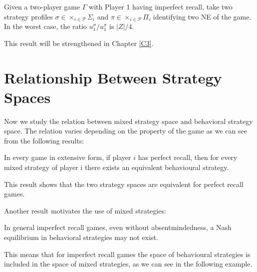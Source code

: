 \begin{prop}\label{prop:Z}
	Given a two-player game $\Gamma$ with Player 1 having imperfect recall, take two strategy profiles $\sigma\in \times_{i\in\mathcal{P}}\Sigma_i $ and $\pi\in \times_{i\in\mathcal{P}}\Pi_i$ identifying two NE of the game. In the worst case, the ratio $u_1^\sigma/u_1^\pi$ is $|Z|/4$.
\end{prop}

This result will be strengthened in Chapter \ref{C3}.




\section{Relationship Between Strategy Spaces}

Now we study the relation between mixed strategy space and behavioral strategy space. The relation varies depending on the property of the game as we can see from the following results:

\begin{prop}\label{prop:2}
	In every game in extensive form, if player $i$ has perfect recall, then for every mixed strategy of player i there exists an equivalent behavioural strategy.
\end{prop}

This result \citep{Kuhn1953} shows that the two strategy spaces are equivalent for perfect recall games.

Another result \citep{Wichardt2008} motivates the use of mixed strategies:
\begin{prop}
	\label{prop:3}
	In general imperfect recall games, even without absentmindedness, a Nash equilibrium in behavioral strategies may not exist.
\end{prop}
\noindent
This means that for imperfect recall games the space of behavioural strategies is included in the space of mixed strategies, as we can see in the following example. \\


